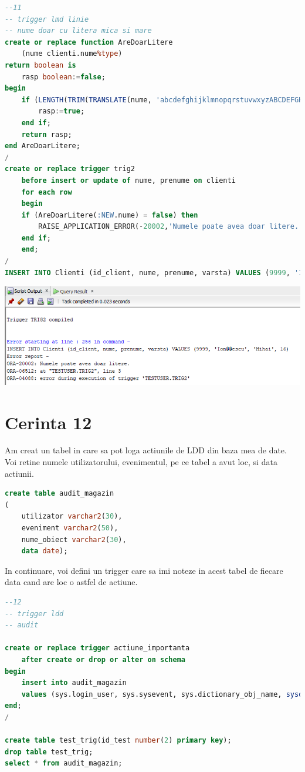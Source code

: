 \documentclass{article}
\begin{document}
\begin{lstlisting}[language=SQL, title=Cerinta 11]
--11
-- trigger lmd linie
-- nume doar cu litera mica si mare
create or replace function AreDoarLitere
    (nume clienti.nume%type)
return boolean is 
	rasp boolean:=false;
begin
    if (LENGTH(TRIM(TRANSLATE(nume, 'abcdefghijklmnopqrstuvwxyzABCDEFGHIJKLMNOPQRSTUVWXYZ', ' '))) is null) then
        rasp:=true;
    end if;
    return rasp;
end AreDoarLitere;
/
create or replace trigger trig2
    before insert or update of nume, prenume on clienti
    for each row
    begin
    if (AreDoarLitere(:NEW.nume) = false) then
        RAISE_APPLICATION_ERROR(-20002,'Numele poate avea doar litere.');
    end if;
    end;
/
INSERT INTO Clienti (id_client, nume, prenume, varsta) VALUES (9999, 'Ion@@escu', 'Mihai', 16);
\end{lstlisting}

\vspace{0.5cm}

\includegraphics[width=\textwidth]{11.png}

\newpage
\section{Cerinta 12}
Am creat un tabel in care sa pot loga actiunile de LDD din baza mea de date.
Voi retine numele utilizatorului, evenimentul, pe ce tabel a avut loc, si data actiunii.

 \begin{lstlisting}[language=SQL]
create table audit_magazin
(
    utilizator varchar2(30),
    eveniment varchar2(50),
    nume_obiect varchar2(30),
    data date);
 \end{lstlisting}

In continuare, voi defini un trigger care sa imi noteze in acest tabel de fiecare data cand are loc o astfel de actiune.

\begin{lstlisting}[language=SQL, title=Cerinta 12]
--12
-- trigger ldd
-- audit

create or replace trigger actiune_importanta
    after create or drop or alter on schema
begin
    insert into audit_magazin
    values (sys.login_user, sys.sysevent, sys.dictionary_obj_name, sysdate);
end;
/

create table test_trig(id_test number(2) primary key);
drop table test_trig;
select * from audit_magazin;
\end{lstlisting}
\end{document}
